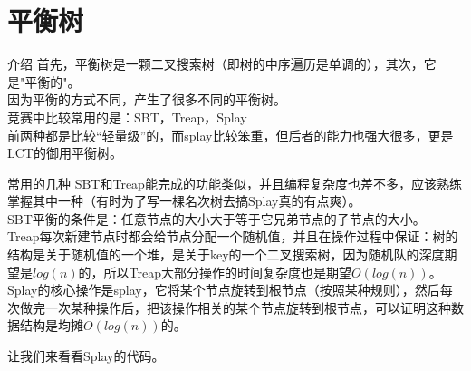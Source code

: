 \documentclass{beamer}
\begin{document}
	\section{平衡树}
		\begin{frame}{介绍}
			首先，平衡树是一颗二叉搜索树（即树的中序遍历是单调的），其次，它是"平衡的"。\\
			因为平衡的方式不同，产生了很多不同的平衡树。\\
			竞赛中比较常用的是：SBT，Treap，Splay  \\
			前两种都是比较“轻量级”的，而splay比较笨重，但后者的能力也强大很多，更是LCT的御用平衡树。  \\
		\end{frame}
		\begin{frame}{常用的几种}
			SBT和Treap能完成的功能类似，并且编程复杂度也差不多，应该熟练掌握其中一种（有时为了写一棵名次树去搞Splay真的有点爽）。\\
			SBT平衡的条件是：任意节点的大小大于等于它兄弟节点的子节点的大小。\\
			Treap每次新建节点时都会给节点分配一个随机值，并且在操作过程中保证：树的结构是关于随机值的一个堆，是关于key的一个二叉搜索树，因为随机队的深度期望是$log(n)$的，所以Treap大部分操作的时间复杂度也是期望$O(log(n))$。\\
			Splay的核心操作是splay，它将某个节点旋转到根节点（按照某种规则），然后每次做完一次某种操作后，把该操作相关的某个节点旋转到根节点，可以证明这种数据结构是均摊$O(log(n))$的。
		\end{frame}
		\begin{frame}
			让我们来看看Splay的代码。
		\end{frame}
	
\end{document}
